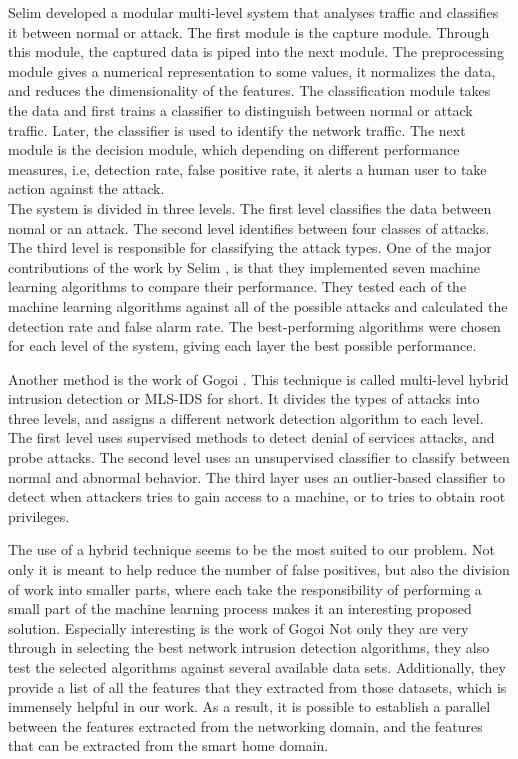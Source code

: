 \begin{itemize}
Selim \etAl \cite{hybridMultilevelIntrusion} developed a modular multi-level system that analyses traffic and classifies it between normal or attack. The first module is the capture module. Through this module, the captured data is piped into the next module. The preprocessing module gives a numerical representation to some values, it normalizes the data, and reduces the dimensionality of the features. The classification module takes the data and first trains a classifier to distinguish between normal or attack traffic. Later, the classifier is used to identify the network traffic. The next module is the decision module, which depending on different performance measures, i.e, detection rate, false positive rate, it alerts a human user to take action against the attack.\\
The system is divided in three levels. The first level classifies the data between nomal or an attack. The second level identifies between four classes of attacks. The third level is responsible for classifying the attack types.
One of the major contributions of the work by Selim \etAl, is that they implemented seven machine learning algorithms to compare their performance. They tested each of the machine learning algorithms against all of the possible attacks and calculated the detection rate and false alarm rate. The best-performing algorithms were chosen for each level of the system, giving each layer the best possible performance.

Another method is the work of Gogoi \etAl \cite{Gogoi01042014}. This technique is called multi-level hybrid intrusion detection or MLS-IDS for short. It divides the types of attacks into three levels, and assigns a different network detection algorithm to each level. The first level uses supervised methods to detect denial of services attacks, and probe attacks. The second level uses an unsupervised classifier to classify between normal and abnormal behavior. The third layer uses an outlier-based classifier to detect when attackers tries to gain access to a machine, or to tries to obtain root privileges.

The use of a hybrid technique seems to be the most suited to our problem. Not only it is meant to help reduce the number of false positives, but also the division of work into smaller parts, where each take the responsibility of performing a small part of the machine learning process makes it an interesting proposed solution. Especially interesting is the work of Gogoi \etAl Not only they are very through in selecting the best network intrusion detection algorithms, they also test the selected algorithms against several available data sets. Additionally, they provide a list of all the features that they extracted from those datasets, which is immensely helpful in our work. As a result, it is possible to establish a parallel between the features extracted from the networking domain, and the features that can be extracted from the smart home domain.


\end{itemize}
